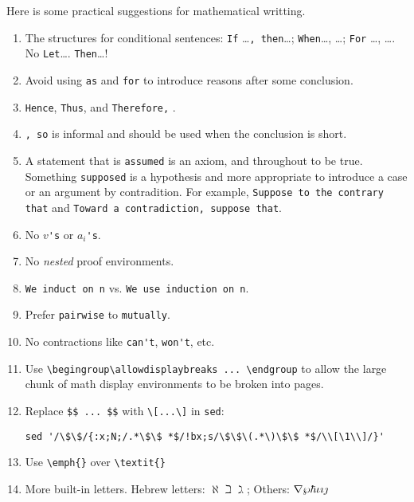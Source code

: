 	
	Here is some practical suggestions for mathematical writting.
	\begin{enumerate}
		\item The structures for conditional sentences: \verb|If| \ldots\verb|, then|\ldots; \verb|When|\ldots, \ldots; \verb|For| \ldots, \ldots. No \verb|Let|\ldots. \verb|Then|\ldots!
		
		\item Avoid using \verb|as| and \verb|for| to introduce reasons after some conclusion.
		
		\item \verb|Hence|, \verb|Thus|, and \verb|Therefore,| .
		
		\item \verb|, so| is informal and should be used when the conclusion is short.
		
		\item A statement that is \verb|assumed| is an axiom, and throughout to be true. Something \verb|supposed| is a hypothesis and more appropriate to introduce a case or an argument by contradition. For example, \verb|Suppose to the contrary that| and \verb|Toward a contradiction, suppose that|.
		
		\item No $ v $\verb|'s| or $ a_{i} $\verb|'s|.
		
		\item No \textit{nested} proof environments.
		
		\item \verb|We induct on n| vs. \verb|We use induction on n|.
		
		\item Prefer \verb|pairwise| to \verb|mutually|.
		
		\item No contractions like \verb|can't|, \verb|won't|, etc.
		
		\item Use \verb|\begingroup\allowdisplaybreaks ... \endgroup| to allow the large chunk of math display environments to be broken into pages.
		
		\item Replace \verb|$$ ... $$| with \verb|\[...\]| in \verb|sed|:
		
		\verb|sed '/\$\$/{:x;N;/.*\$\$ *$/!bx;s/\$\$\(.*\)\$\$ *$/\\[\1\\]/}'|
		
		\item Use \verb*|\emph{}| over \verb|\textit{}|
		
		\item More built-in letters. Hebrew letters: $ \aleph \beth \gimel $; Others: $ \nabla \wp \hbar \box \eth \iota \imath \jmath $
		
	\end{enumerate}
	

